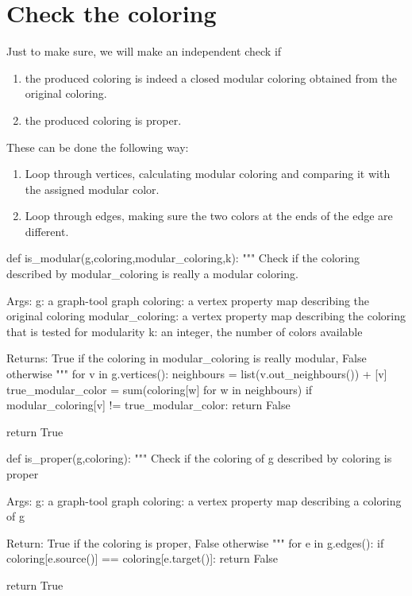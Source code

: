 \documentclass[letterpaper]{article}
\begin{document}
\section{Check the coloring}

Just to make sure, we will make an independent check if
\begin{enumerate}
   \item the produced coloring is indeed a closed modular coloring obtained
      from the original coloring.
   \item the produced coloring is proper.
\end{enumerate}

These can be done the following way:
\begin{enumerate}
   \item Loop through vertices, calculating modular coloring and comparing it
      with the assigned modular color.
   \item Loop through edges, making sure the two colors at the ends of the edge
      are different. 
\end{enumerate}

\begin{pyblock}
def is_modular(g,coloring,modular_coloring,k):
   """
   Check if the coloring described by modular_coloring is really a
   modular coloring. 

   Args:
      g: a graph-tool graph
      coloring: a vertex property map describing the original
         coloring
      modular_coloring: a vertex property map describing the
         coloring that is tested for modularity
      k: an integer, the number of colors available

   Returns:
      True if the coloring in modular_coloring is really modular,
      False otherwise
   """
   for v in g.vertices():
      neighbours = list(v.out_neighbours()) + [v]
      true_modular_color = sum(coloring[w] 
                               for w in neighbours) %
      if modular_coloring[v] != true_modular_color:
         return False

   return True

def is_proper(g,coloring):
   """
   Check if the coloring of g described by coloring is proper

   Args:
      g: a graph-tool graph
      coloring: a vertex property map describing a coloring of g

   Return:
      True if the coloring is proper, False otherwise
   """
   for e in g.edges():
      if coloring[e.source()] == coloring[e.target()]:
         return False

   return True
\end{pyblock}
\end{document}
